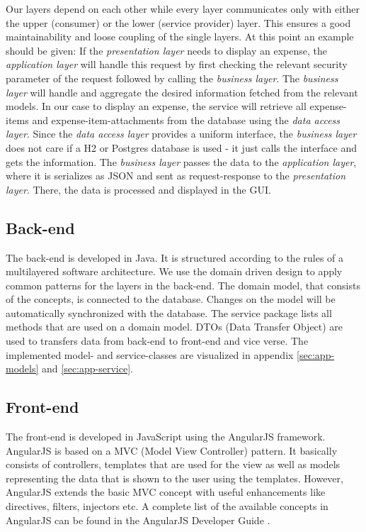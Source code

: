 Our layers depend on each other while every layer communicates only with either the upper (consumer) or the lower (service provider) layer. This ensures a good maintainability and loose coupling of the single layers.\newline
At this point an example should be given: If the \textit{presentation layer} needs to display an expense, the \textit{application layer} will handle this request by first checking the relevant security parameter of the request followed by calling the \textit{business layer}. The \textit{business layer} will handle and aggregate the desired information fetched from the relevant models. In our case to display an expense, the service will retrieve all expense-items and expense-item-attachments from the database using the \textit{data access layer}. Since the \textit{data access layer} provides a uniform interface, the \textit{business layer} does not care if a H2 or Postgres database is used - it just calls the interface and gets the information. The \textit{business layer} passes the data to the \textit{application layer}, where it is serializes as JSON and sent as request-response to the \textit{presentation layer}. There, the data is processed and displayed in the GUI.

\subsection{Back-end}
The back-end is developed in Java. It is structured according to the rules of a multilayered software architecture. We use the domain driven design \cite{ddd} to apply common patterns for the layers in the back-end. The domain model, that consists of the concepts, is connected to the database. Changes on the model will be automatically synchronized with the database. The service package lists all methods that are used on a domain model.\newline
DTOs (Data Transfer Object) are used to transfers data from back-end to front-end and vice verse. \newline 
The implemented model- and service-classes are visualized in appendix \ref{sec:app-models} and \ref{sec:app-service}.

\subsection{Front-end}
The front-end is developed in JavaScript using the AngularJS framework\cite{angular}. AngularJS is based on a MVC (Model View Controller) pattern. It basically consists of controllers, templates that are used for the view  as well as models representing the data that is shown to the user using the templates. However, AngularJS  extends the basic MVC concept with useful enhancements like directives, filters, injectors etc. A complete list of the available concepts in AngularJS can be found in the AngularJS Developer Guide \cite{angular-devguide}.

